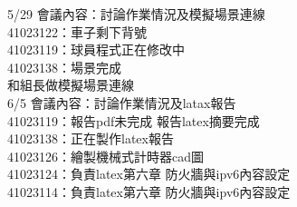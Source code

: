5/29 會議內容：討論作業情況及模擬場景連線\\
41023122：車子剩下背號\\
41023119：球員程式正在修改中\\
41023138：場景完成\\
和組長做模擬場景連線\\

6/5 會議內容：討論作業情況及latax報告\\
41023119：報告pdf未完成 報告latex摘要完成\\
41023138：正在製作latex報告\\
41023126：繪製機械式計時器cad圖\\
41023124：負責latex第六章 防火牆與ipv6內容設定\\
41023114：負責latex第六章 防火牆與ipv6內容設定\\
\newpage

\renewcommand{\baselinestretch}{1} %
